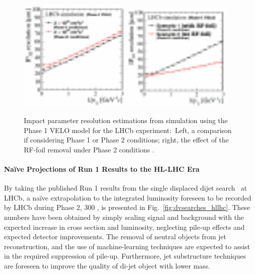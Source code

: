 \begin{figure}[t]
\centerline{
\includegraphics[width=0.48\textwidth]{figures/velo_ph21.pdf}
\includegraphics[width=0.48\textwidth]{figures/velo_ph22.pdf}
}
  \caption{Impact parameter resolution estimations from simulation using the Phase 1 VELO model for the LHCb experiment:~Left, a comparison if considering Phase 1 or Phase 2 conditions; right, the effect of the RF-foil removal under Phase 2 conditions \cite{Aaij:2244311}.}
  \label{fig:veloip_hllhc}
\end{figure}

\paragraph{Na\"ive Projections of Run 1 Results to the HL-LHC Era}

By taking the published Run 1 results from the single displaced dijet search~\cite{Aaij:2017mic} at LHCb, a na\"ive extrapolation to the integrated luminosity foreseen to be recorded by LHCb during Phase 2, 300 \invfb, is presented in Fig.~\ref{fig:dvsearches_hllhc}. These numbers have been obtained by simply scaling signal and background with the expected increase in cross section and luminosity, neglecting pile-up effects and expected detector improvements.
The removal of neutral objects from jet reconstruction, and the use of machine-learning techniques are expected to assist in the required suppression of pile-up. Furthermore, jet substructure techniques are foreseen to improve the quality of di-jet object with lower mass.



